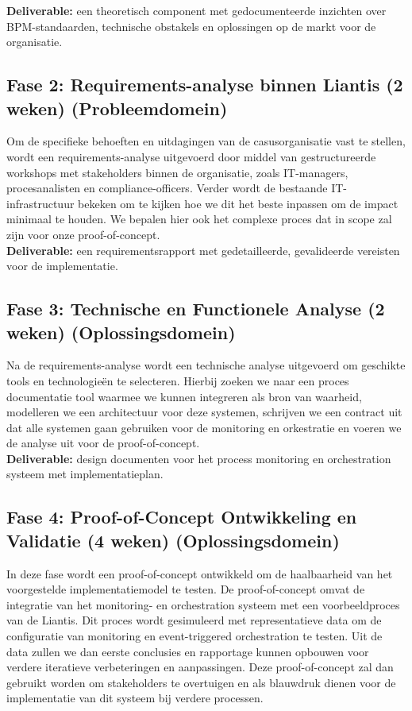 \textbf{Deliverable:} een theoretisch component met gedocumenteerde inzichten over BPM-standaarden, technische obstakels en oplossingen op de markt voor de organisatie.

\subsection{Fase 2: Requirements-analyse binnen Liantis (2 weken) (Probleemdomein)}

Om de specifieke behoeften en uitdagingen van de casusorganisatie vast te stellen, wordt een requirements-analyse uitgevoerd door middel van gestructureerde workshops met stakeholders binnen de organisatie, zoals IT-managers, procesanalisten en compliance-officers. Verder wordt de bestaande IT-infrastructuur bekeken om te kijken hoe we dit het beste inpassen om de impact minimaal te houden. We bepalen hier ook het complexe proces dat in scope zal zijn voor onze proof-of-concept. \\

\textbf{Deliverable:} een requirementsrapport met gedetailleerde, gevalideerde vereisten voor de implementatie.

\subsection{Fase 3: Technische en Functionele Analyse (2 weken) (Oplossingsdomein)}

Na de requirements-analyse wordt een technische analyse uitgevoerd om geschikte tools en technologieën te selecteren. Hierbij zoeken we naar een proces documentatie tool waarmee we kunnen integreren als bron van waarheid, modelleren we een architectuur voor deze systemen, schrijven we een contract uit dat alle systemen gaan gebruiken voor de monitoring en orkestratie en voeren we de analyse uit voor de proof-of-concept.  \\

\textbf{Deliverable:} design documenten voor het process monitoring en orchestration systeem met implementatieplan.

\subsection{Fase 4: Proof-of-Concept Ontwikkeling en Validatie (4 weken) (Oplossingsdomein)}

In deze fase wordt een proof-of-concept ontwikkeld om de haalbaarheid van het voorgestelde implementatiemodel te testen. De proof-of-concept omvat de integratie van het monitoring- en orchestration systeem met een voorbeeldproces van de Liantis. Dit proces wordt gesimuleerd met representatieve data om de configuratie van monitoring en event-triggered orchestration te testen. Uit de data zullen we dan eerste conclusies en rapportage kunnen opbouwen voor verdere iteratieve verbeteringen en aanpassingen. Deze proof-of-concept zal dan gebruikt worden om stakeholders te overtuigen en als blauwdruk dienen voor de implementatie van dit systeem bij verdere processen. \\

